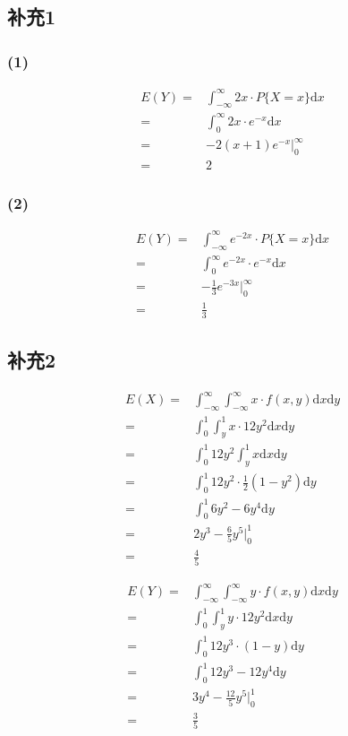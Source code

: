 \documentclass[a4paper,12pt]{ctexart}
\begin{document}
\subsection*{补充1}

\subsubsection*{(1)}

\begin{align*}
	E(Y) =& \int_{-\infty}^{\infty} 2x \cdot P\{X = x\} \mathrm{d}x \\
	=& \int_{0}^{\infty} 2x \cdot e^{-x} \mathrm{d}x \\
	=& -2(x + 1)e^{-x} \bigg|_0^\infty \\
	=& 2
\end{align*}

\subsubsection*{(2)}

\begin{align*}
	E(Y) =& \int_{-\infty}^{\infty} e^{-2x} \cdot P\{X = x\} \mathrm{d}x \\
	=& \int_{0}^{\infty} e^{-2x} \cdot e^{-x} \mathrm{d}x \\
	=& -\frac{1}{3} e^{-3x} \bigg|_0^\infty \\
	=& \frac{1}{3}
\end{align*}

\subsection*{补充2}

\begin{align*}
	E(X) =& \int_{-\infty}^{\infty} \int_{-\infty}^{\infty} x \cdot f(x,y) \mathrm{d}x \mathrm{d}y \\
	=& \int_{0}^{1} \int_{y}^{1} x \cdot 12y^2 \mathrm{d}x \mathrm{d}y \\
	=& \int_{0}^{1} 12y^2 \int_{y}^{1} x \mathrm{d}x \mathrm{d}y \\
	=& \int_{0}^{1} 12y^2 \cdot \frac{1}{2} (1 - y^2) \mathrm{d}y \\
	=& \int_{0}^{1} 6y^2 - 6y^4 \mathrm{d}y \\
	=& 2y^3 - \frac{6}{5} y^5 \bigg|_0^1 \\
	=& \frac{4}{5}
\end{align*}

\begin{align*}
	E(Y) =& \int_{-\infty}^{\infty} \int_{-\infty}^{\infty} y \cdot f(x,y) \mathrm{d}x \mathrm{d}y \\
	=& \int_{0}^{1} \int_{y}^{1} y \cdot 12y^2 \mathrm{d}x \mathrm{d}y \\
	=& \int_{0}^{1} 12y^3 \cdot (1 - y) \mathrm{d}y \\
	=& \int_{0}^{1} 12y^3 - 12y^4 \mathrm{d}y \\
	=& 3y^4 - \frac{12}{5} y^5 \bigg|_0^1 \\
	=& \frac{3}{5}
\end{align*}
\end{document}
